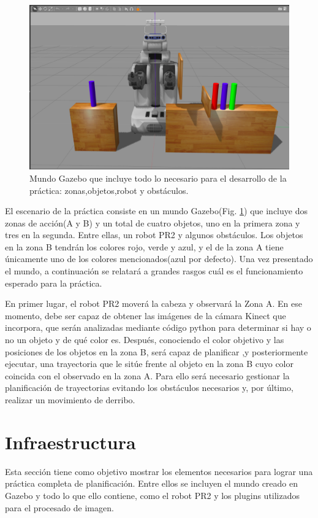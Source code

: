 \documentclass[12pt,spanish,chapterprefix, numbers=noenddot]{book}
\numberwithin{equation}{section}
\numberwithin{figure}{section}
\begin{document}
\begin{figure}[hbt!]
\centering
\includegraphics[width=12cm]{Figs/tfg_gazebo_world.png}
\par
\caption{\label{fig:Mundo-gazebo}Mundo Gazebo que incluye todo lo necesario para el desarrollo de la práctica: zonas,objetos,robot y obstáculos.}
\end{figure}

El escenario de la práctica consiste en un mundo Gazebo(Fig. \ref{fig:Mundo-gazebo}) que incluye dos zonas de acción(A y B) y un total de cuatro objetos, uno en la primera zona y tres en la segunda. Entre ellas, un robot PR2 y algunos obstáculos. Los objetos en la zona B tendrán los colores rojo, verde y azul, y el de la zona A tiene únicamente uno de los colores mencionados(azul por defecto). Una vez presentado el mundo, a continuación se relatará a grandes rasgos cuál es el funcionamiento esperado para la práctica. 

En primer lugar,  el robot PR2 moverá la cabeza y observará la Zona A. En ese momento, debe ser capaz de obtener las imágenes de la cámara Kinect que incorpora, que serán analizadas mediante código python para determinar si hay o no un objeto y de qué color es. 
Después, conociendo el color objetivo y las posiciones de los objetos en la zona B, será capaz de planificar ,y posteriormente ejecutar, una trayectoria que le sitúe frente al objeto en la zona B cuyo color coincida con el observado en la zona A. Para ello será necesario gestionar la planificación de trayectorias evitando los obstáculos necesarios y, por último, realizar un movimiento de derribo.




\section{Infraestructura}
Esta sección tiene como objetivo mostrar los elementos necesarios para lograr una práctica completa de planificación. Entre ellos se incluyen el mundo creado en Gazebo y todo lo que ello contiene, como el robot PR2 y los plugins utilizados para el procesado de imagen.  
\end{document}
